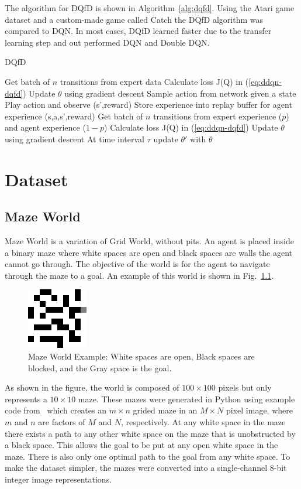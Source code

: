 \documentclass[12pt,american]{report}
\begin{document}
The algorithm for DQfD is shown in Algorithm~\ref{alg:dqfd}. Using the Atari game dataset and a custom-made game called Catch the DQfD algorithm was compared to DQN.  In most cases, DQfD learned faster due to the transfer learning step and out performed DQN and Double DQN.
\begin{algorithm}
\caption{DQfD}
\label{alg:dqfd}
\begin{algorithmic} 
\State Get batch of $n$ transitions from expert data
\State Calculate loss J(Q) in (\ref{eq:ddqn-dqfd})
\State Update $\theta$ using gradient descent
\EndFor
{}
\State Sample action from network given a state
\State Play action and observe (s',reward)
\State Store experience into replay buffer for agent experience (s,a,s',reward)
\State Get batch of $n$ transitions from expert experience ($p$) and agent experience ($1-p$)
\State Calculate loss J(Q) in (\ref{eq:ddqn-dqfd})
\State Update $\theta$ using gradient descent
\State At time interval $\tau$ update $\theta'$ with $\theta$
\EndFor
\end{algorithmic}
\end{algorithm}


\chapter{Dataset}
\label{sec:dataset}
\section{Maze World}
Maze World is a variation of Grid World, without pits.  An agent is placed inside a binary maze where white spaces are open and black spaces are walls the agent cannot go through.  The objective of the world is for the agent to navigate through the maze to a goal.  An example of this world is shown in Fig.~\ref{fig:maze_world_example}.
\begin{figure}
\centering
\includegraphics[scale=1.25]{images/maze_world_example.png}
\caption{Maze World Example: White spaces are open, Black spaces are blocked, and the Gray space is the goal.}
\label{fig:maze_world_example}
\end{figure}
As shown in the figure, the world is composed of $100\times 100$ pixels but only represents a $10\times 10$ maze.  These mazes were generated in Python using example code from~\cite{maze_code} which creates an $m\times n$ grided maze in an $M\times N$ pixel image, where $m$ and $n$ are factors of $M$ and $N$, respectively.  At any white space in the maze there exists a path to any other white space on the maze that is unobstructed by a black space.  This allows the goal to be put at any open white space in the maze.  There is also only one optimal path to the goal from any white space. To make the dataset simpler, the mazes were converted into a single-channel 8-bit integer image representations.  
\end{document}
